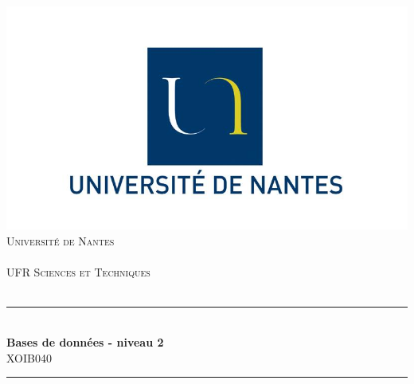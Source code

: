 \setlength{\parindent}{0cm}
\setlength{\parskip}{1ex plus 0.5ex minus 0.2ex}
\newcommand{\hsp}{\hspace{20pt}}
\newcommand{\HRule}{\rule{\linewidth}{0.5mm}}
\begin{titlepage}
  \begin{sffamily}
  \begin{center}

    \includegraphics[scale=0.2]{logo.jpg}\\[2cm]

    \textsc{\LARGE Université de Nantes}\\
    \textsc{\LARGE  }\\
    \textsc{\Large UFR Sciences et Techniques}\\
    \textsc{\LARGE  }\\
 	[1.5cm]
    \HRule \\[0.4cm]
    { \huge \bfseries Bases de données - niveau 2 \\[0.4cm]
    	
     }
     \textsc{\Large XOIB040}\\
    \HRule \\[1cm]

    

\end{center}
\end{sffamily}
\end{titlepage}
